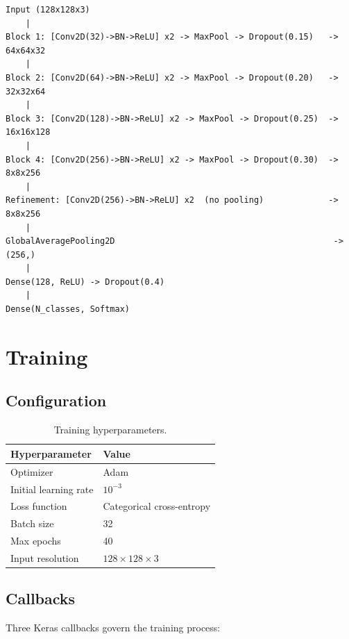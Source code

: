 \documentclass[12pt,a4paper]{article}
\begin{document}
\begin{lstlisting}
Input (128x128x3)
    |
Block 1: [Conv2D(32)->BN->ReLU] x2 -> MaxPool -> Dropout(0.15)   -> 64x64x32
    |
Block 2: [Conv2D(64)->BN->ReLU] x2 -> MaxPool -> Dropout(0.20)   -> 32x32x64
    |
Block 3: [Conv2D(128)->BN->ReLU] x2 -> MaxPool -> Dropout(0.25)  -> 16x16x128
    |
Block 4: [Conv2D(256)->BN->ReLU] x2 -> MaxPool -> Dropout(0.30)  -> 8x8x256
    |
Refinement: [Conv2D(256)->BN->ReLU] x2  (no pooling)             -> 8x8x256
    |
GlobalAveragePooling2D                                            -> (256,)
    |
Dense(128, ReLU) -> Dropout(0.4)
    |
Dense(N_classes, Softmax)
\end{lstlisting}

\section{Training}

\subsection{Configuration}

\begin{table}[H]
  \centering
  \begin{tabular}{ll}
    \toprule
    \textbf{Hyperparameter} & \textbf{Value} \\
    \midrule
    Optimizer         & Adam \\
    Initial learning rate & $10^{-3}$ \\
    Loss function     & Categorical cross-entropy \\
    Batch size        & 32 \\
    Max epochs        & 40 \\
    Input resolution  & $128 \times 128 \times 3$ \\
    \bottomrule
  \end{tabular}
  \caption{Training hyperparameters.}
\end{table}

\subsection{Callbacks}

Three Keras callbacks govern the training process:
\end{document}
